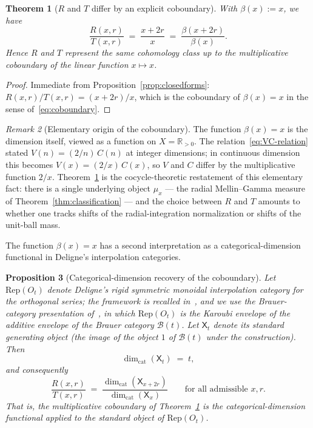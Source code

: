 \documentclass[11pt,a4paper]{article}
\theoremstyle{plain}
\newtheorem{theorem}{Theorem}[section]
\newtheorem{proposition}[theorem]{Proposition}
\theoremstyle{definition}
\theoremstyle{remark}
\newtheorem{remark}[theorem]{Remark}
\newcommand{\R}{\mathbb{R}}
\begin{document}
\begin{theorem}[$R$ and $T$ differ by an explicit coboundary]\label{thm:coboundary}
With $\beta(x) := x$, we have
\[
\frac{R(x,r)}{T(x,r)} \;=\; \frac{x+2r}{x} \;=\; \frac{\beta(x+2r)}{\beta(x)}.
\]
Hence $R$ and $T$ represent the same cohomology class up to the multiplicative coboundary of the linear function $x\mapsto x$.
\end{theorem}

\begin{proof}
Immediate from Proposition~\ref{prop:closedforms}: $R(x,r)/T(x,r) = (x+2r)/x$, which is the coboundary of $\beta(x)=x$ in the sense of~\eqref{eq:coboundary}.
\end{proof}

\begin{remark}[Elementary origin of the coboundary]\label{rmk:elem-coboundary}
The function $\beta(x)=x$ is the dimension itself, viewed as a function on $X = \R_{>0}$. The relation~\eqref{eq:VC-relation} stated $V(n) = (2/n)\,C(n)$ at integer dimensions; in continuous dimension this becomes $V(x)=(2/x)\,C(x)$, so $V$ and $C$ differ by the multiplicative function $2/x$. Theorem~\ref{thm:coboundary} is the cocycle-theoretic restatement of this elementary fact: there is a single underlying object $\mu_x$ — the radial Mellin--Gamma measure of Theorem~\ref{thm:classification} — and the choice between $R$ and $T$ amounts to whether one tracks shifts of the radial-integration normalization or shifts of the unit-ball mass.
\end{remark}

The function $\beta(x) = x$ has a second interpretation as a categorical-dimension functional in Deligne's interpolation categories.

\begin{proposition}[Categorical-dimension recovery of the coboundary]\label{prop:cat-coboundary}
Let $\mathrm{Rep}(O_t)$ denote Deligne's rigid symmetric monoidal interpolation category for the orthogonal series; the framework is recalled in~\cite[\S\S 9--10]{Deligne2007}, and we use the Brauer-category presentation of~\cite[\S\S 2.1--2.2]{ComesHeidersdorf2017}, in which $\mathrm{Rep}(O_t)$ is the Karoubi envelope of the additive envelope of the Brauer category $\mathcal B(t)$. Let $\mathsf X_t$ denote its standard generating object (the image of the object $1$ of $\mathcal B(t)$ under the construction). Then
\begin{equation}\label{eq:cat-dim}
\dim_{\mathrm{cat}}(\mathsf X_t) \;=\; t,
\end{equation}
and consequently
\[
\frac{R(x,r)}{T(x,r)} \;=\; \frac{\dim_{\mathrm{cat}}(\mathsf X_{x+2r})}{\dim_{\mathrm{cat}}(\mathsf X_x)}
\qquad\text{for all admissible } x,r.
\]
That is, the multiplicative coboundary of Theorem~\ref{thm:coboundary} is the categorical-dimension functional applied to the standard object of $\mathrm{Rep}(O_t)$.
\end{proposition}
\end{document}
